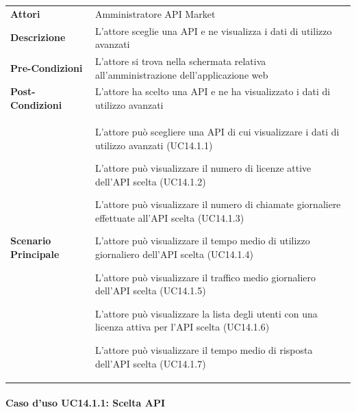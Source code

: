 \begin{minipage}{\linewidth}
	\begin{tabular}{ l | p{11cm}}
		\hline
		\rowcolor{Gray}
		\multicolumn{2}{c}{UC14.1 - Visualizzazione dati di utilizzo avanzati} \\
		\hline
		\textbf{Attori} &  Amministratore API Market \\
		\textbf{Descrizione} & L'attore sceglie una API e ne visualizza i dati di utilizzo avanzati \\
		\textbf{Pre-Condizioni} & L'attore si trova nella schermata relativa all'amministrazione dell'applicazione web \\
		\textbf{Post-Condizioni} & L'attore ha scelto una API e ne ha visualizzato i dati di utilizzo avanzati \\
		\textbf{Scenario Principale} & 
		\begin{enumerate*}[label=(\arabic*.),itemjoin={\newline}]
			\item L'attore può scegliere una API di cui visualizzare i dati di utilizzo avanzati (UC14.1.1)
			\item L'attore può visualizzare il numero di licenze attive dell'API scelta (UC14.1.2)
			\item L'attore può visualizzare il numero di chiamate giornaliere effettuate all'API scelta (UC14.1.3)
			\item L'attore può visualizzare il tempo medio di utilizzo giornaliero dell'API scelta (UC14.1.4)
			\item L'attore può visualizzare il traffico medio giornaliero dell'API scelta (UC14.1.5)
			\item L'attore può visualizzare la lista degli utenti con una licenza attiva per l'API scelta (UC14.1.6)
			\item L'attore può visualizzare il tempo medio di risposta dell'API scelta (UC14.1.7)
		\end{enumerate*}\\
	\end{tabular}
\end{minipage}

\paragraph{Caso d'uso UC14.1.1: Scelta API}
\label{UC14_1_1}

